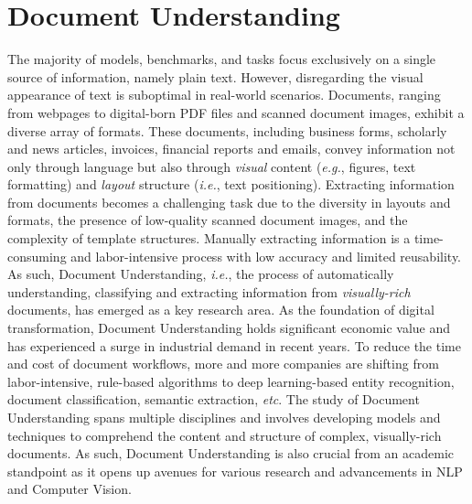 \chapter{Document Understanding}
\label{chapter:related-document-understanding}


\renewcommand{\leftmark}{\spacedlowsmallcaps{Document Understanding}}


\minitoc


The majority of models, benchmarks, and tasks focus exclusively on a single source of information, namely plain text. However, disregarding the visual appearance of text is suboptimal in real-world scenarios. Documents, ranging from webpages to digital-born PDF files and scanned document images, exhibit a diverse array of formats. These documents, including business forms, scholarly and news articles, invoices, financial reports and emails, convey information not only through language but also through \textit{visual} content (\textit{e.g.}, figures, text formatting) and \textit{layout} structure (\textit{i.e.}, text positioning). Extracting information from documents becomes a challenging task due to the diversity in layouts and formats, the presence of low-quality scanned document images, and the complexity of template structures. Manually extracting information is a time-consuming and labor-intensive process with low accuracy
and limited reusability. As such, Document Understanding, \textit{i.e.}, the process of automatically understanding, classifying and extracting information from \textit{visually-rich} documents, has emerged as a key research area. As the foundation of digital transformation, Document Understanding holds significant economic value and has experienced a surge in industrial demand in recent years. To reduce the time and cost of document workflows, more and more companies are shifting from labor-intensive, rule-based algorithms to deep learning-based entity recognition, document classification, semantic extraction, \textit{etc}. The study of Document Understanding spans multiple disciplines and involves developing models and techniques to comprehend the content and structure of complex, visually-rich documents. As such, Document Understanding is also crucial from an academic standpoint as it opens up avenues for various research and advancements in \ac{NLP} and Computer Vision. 

